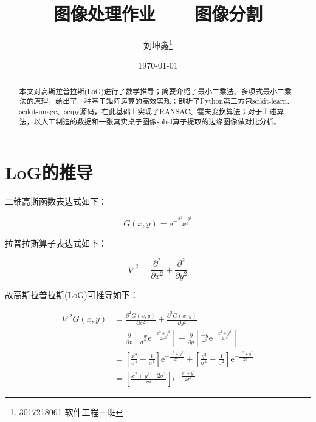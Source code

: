 \documentclass{article}
\begin{document}
\title{图像处理作业——图像分割}
\author{刘坤鑫\thanks{3017218061 软件工程一班}}
\date{\today}
\maketitle
\begin{abstract}
本文对高斯拉普拉斯(LoG)进行了数学推导；简要介绍了最小二乘法、多项式最小二乘法的原理，给出了一种基于矩阵运算的高效实现；剖析了Python第三方包scikit-learn、scikit-image、scipy源码，在此基础上实现了RANSAC、霍夫变换算法；对于上述算法，以人工制造的数据和一张真实桌子图像sobel算子提取的边缘图像做对比分析。
\end{abstract}

\section{LoG的推导}

二维高斯函数表达式如下：

\begin{equation}
G(x, y)=\mathrm{e}^{-\frac{x^{2}+y^{2}}{2 \sigma^{2}}}
\end{equation}

拉普拉斯算子表达式如下：

\begin{equation}
\nabla^{2} = \frac{\partial^2 }{\partial x^2} + \frac{\partial^2 }{\partial y^2}
\end{equation}

故高斯拉普拉斯(LoG)可推导如下：

\begin{equation}
\begin{aligned} \nabla^{2} G(x, y) &=\frac{\partial^{2} G(x, y)}{\partial x^{2}}+\frac{\partial^{2} G(x, y)}{\partial y^{2}} \\ &=\frac{\partial}{\partial x}\left[\frac{-x}{\sigma^{2}} \mathrm{e}^{-\frac{x^{2}+y^{2}}{2 \sigma^{2}}}\right]+\frac{\partial}{\partial y}\left[\frac{-y}{\sigma^{2}} \mathrm{e}^{-\frac{x^{2}+y^{2}}{2 \sigma^{2}}}\right] \\ &=\left[\frac{x^{2}}{\sigma^{4}}-\frac{1}{\sigma^{2}}\right] \mathrm{e}^{-\frac{x^{2}+y^{2}}{2 \sigma^{2}}}+\left[\frac{y^{2}}{\sigma^{4}}-\frac{1}{\sigma^{2}}\right] \mathrm{e}^{-\frac{x^{2}+y^{2}}{2 \sigma^{2}}} \\ &=\left[\frac{x^{2}+y^{2}-2 \sigma^{2}}{\sigma^{4}}\right] e^{-\frac{x^{2}+y^{2}}{2 \sigma^{2}}} \end{aligned}
\end{equation}
\end{document}
